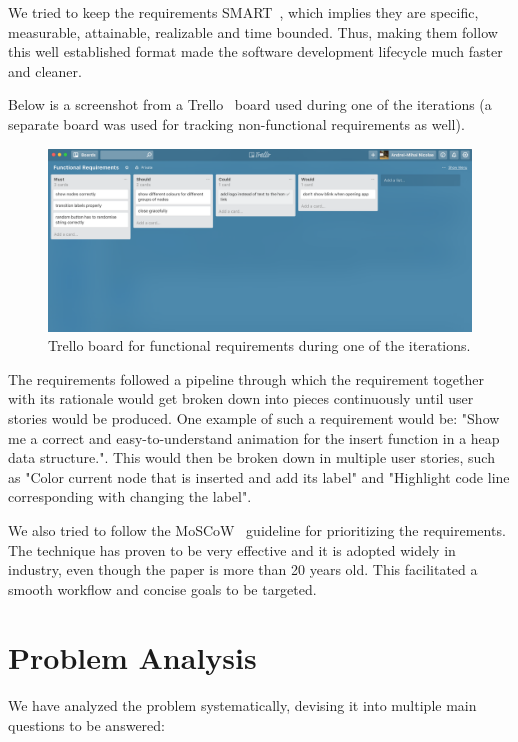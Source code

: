 \documentclass{l4proj}
\begin{document}
We tried to keep the requirements SMART~\cite{smart-requirements}, which implies they are specific, measurable, attainable, realizable and time bounded. Thus, making them follow this well established format made the software development lifecycle much faster and cleaner.

Below is a screenshot from a Trello~\cite{trello} board used during one of the iterations (a separate board was used for tracking non-functional requirements as well).

\begin{figure}[!ht]
\centering
\includegraphics[scale=0.35]{trello-functional-requirements}
\caption{Trello board for functional requirements during one of the iterations.}
\label{fig:trello-functional-requirements}
\end{figure}

The requirements followed a pipeline through which the requirement together with its rationale would get broken down into pieces continuously until user stories would be produced. One example of such a requirement would be: "Show me a correct and easy-to-understand animation for the insert function in a heap data structure.". This would then be broken down in multiple user stories, such as "Color current node that is inserted and add its label" and "Highlight code line corresponding with changing the label".

We also tried to follow the MoSCoW~\cite{moscow-requirements} guideline for prioritizing the requirements. The technique has proven to be very effective and it is adopted widely in industry, even though the paper is more than 20 years old. This facilitated a smooth workflow and concise goals to be targeted.

\section{Problem Analysis}

We have analyzed the problem systematically, devising it into multiple main questions to be answered:
\end{document}
